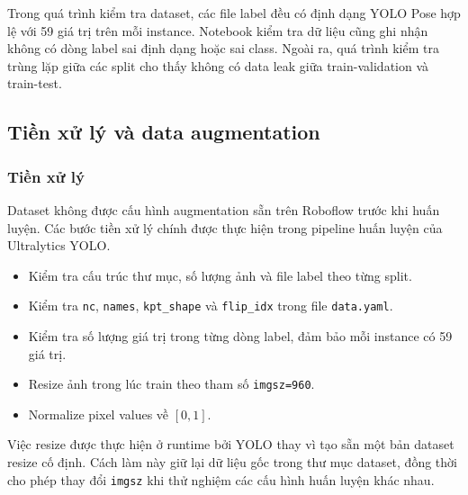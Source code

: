 \documentclass[12pt, a4paper]{article}
\begin{document}
Trong quá trình kiểm tra dataset, các file label đều có định dạng YOLO Pose hợp lệ với 59 giá trị trên mỗi instance.
Notebook kiểm tra dữ liệu cũng ghi nhận không có dòng label sai định dạng hoặc sai class.
Ngoài ra, quá trình kiểm tra trùng lặp giữa các split cho thấy không có data leak giữa train-validation và train-test.

\subsection{Tiền xử lý và data augmentation}

\subsubsection{Tiền xử lý}
Dataset không được cấu hình augmentation sẵn trên Roboflow trước khi huấn luyện.
Các bước tiền xử lý chính được thực hiện trong pipeline huấn luyện của Ultralytics YOLO.
\begin{itemize}[nosep]
  \item Kiểm tra cấu trúc thư mục, số lượng ảnh và file label theo từng split.
  \item Kiểm tra \texttt{nc}, \texttt{names}, \texttt{kpt\_shape} và \texttt{flip\_idx} trong file \texttt{data.yaml}.
  \item Kiểm tra số lượng giá trị trong từng dòng label, đảm bảo mỗi instance có 59 giá trị.
  \item Resize ảnh trong lúc train theo tham số \texttt{imgsz=960}.
  \item Normalize pixel values về $[0, 1]$.
\end{itemize}

Việc resize được thực hiện ở runtime bởi YOLO thay vì tạo sẵn một bản dataset resize cố định.
Cách làm này giữ lại dữ liệu gốc trong thư mục dataset, đồng thời cho phép thay đổi \texttt{imgsz} khi thử nghiệm các cấu hình huấn luyện khác nhau.
\end{document}
